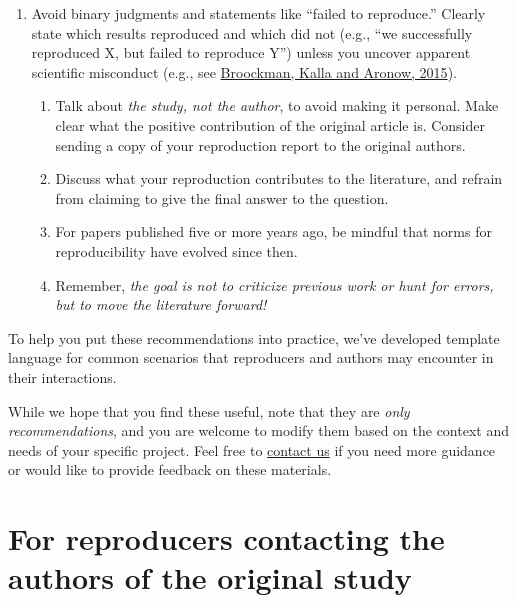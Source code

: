 \documentclass[]{book}
\providecommand{\tightlist}{%
  \setlength{\itemsep}{0pt}\setlength{\parskip}{0pt}}
\begin{document}
\begin{enumerate}
\def\labelenumi{\alph{enumi}.}
\tightlist
\item
  Avoid binary judgments and statements like ``failed to reproduce.'' Clearly state which results reproduced and which did not (e.g., ``we successfully reproduced X, but failed to reproduce Y'') unless you uncover apparent scientific misconduct (e.g., see \href{https://doi.org/10.31222/osf.io/qy2se}{Broockman, Kalla and Aronow, 2015}).

  \begin{enumerate}
  \def\labelenumii{\alph{enumii}.}
  \setcounter{enumii}{1}
  \tightlist
  \item
    Talk about \emph{the study, not the author}, to avoid making it personal. Make clear what the positive contribution of the original article is. Consider sending a copy of your reproduction report to the original authors.\\
  \item
    Discuss what your reproduction contributes to the literature, and refrain from claiming to give the final answer to the question.\\
  \item
    For papers published five or more years ago, be mindful that norms for reproducibility have evolved since then.\\
  \item
    Remember, \emph{the goal is not to criticize previous work or hunt for errors, but to move the literature forward!}
  \end{enumerate}
\end{enumerate}

To help you put these recommendations into practice, we've developed template language for common scenarios that reproducers and authors may encounter in their interactions.

While we hope that you find these useful, note that they are \emph{only recommendations}, and you are welcome to modify them based on the context and needs of your specific project. Feel free to \href{mailto:acre@berkeley.edu}{contact us} if you need more guidance or would like to provide feedback on these materials.

\hypertarget{for-reproducers-contacting-the-authors-of-the-original-study}{%
\section{For reproducers contacting the authors of the original study}\label{for-reproducers-contacting-the-authors-of-the-original-study}}
\end{document}

